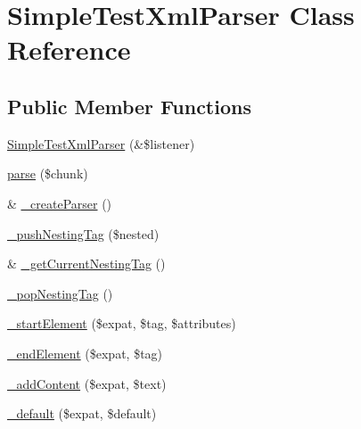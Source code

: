 \hypertarget{class_simple_test_xml_parser}{
\section{SimpleTestXmlParser Class Reference}
\label{class_simple_test_xml_parser}
}
\subsection*{Public Member Functions}
\begin{DoxyCompactItemize}
\item 
\hyperlink{class_simple_test_xml_parser_a2d2e15390947baa26a5771971ca3917b}{SimpleTestXmlParser} (\&\$listener)
\item 
\hyperlink{class_simple_test_xml_parser_af5eff8c0132f452c47bca965d6ff37ed}{parse} (\$chunk)
\item 
\& \hyperlink{class_simple_test_xml_parser_a9a5607a7f11af705736a773612a7ec6d}{\_\-createParser} ()
\item 
\hyperlink{class_simple_test_xml_parser_ac3481993c4f5916b3b1039ac55b76d53}{\_\-pushNestingTag} (\$nested)
\item 
\& \hyperlink{class_simple_test_xml_parser_a4e33d00bbb8093f93331b6b4f6965947}{\_\-getCurrentNestingTag} ()
\item 
\hyperlink{class_simple_test_xml_parser_ade10e92d51ae121640bc16aa7d73e581}{\_\-popNestingTag} ()
\item 
\hyperlink{class_simple_test_xml_parser_ae6de8ccde9c5bed8742498edf6818cdb}{\_\-startElement} (\$expat, \$tag, \$attributes)
\item 
\hyperlink{class_simple_test_xml_parser_a19b250a47739a907ebe69a9cd7b0e3bd}{\_\-endElement} (\$expat, \$tag)
\item 
\hyperlink{class_simple_test_xml_parser_a574d2bd0039708a19f9f7f73d188c537}{\_\-addContent} (\$expat, \$text)
\item 
\hyperlink{class_simple_test_xml_parser_a3d549714cdcc6015cb519adb990d0033}{\_\-default} (\$expat, \$default)
\end{DoxyCompactItemize}
